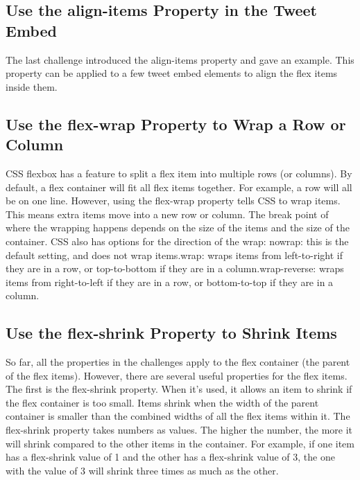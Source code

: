 \documentclass{article}%
\begin{document}
%
\subsection{Use the align{-}items Property in the Tweet Embed}%
\label{subsec:Usethealign{-}itemsPropertyintheTweetEmbed}%
The last challenge introduced the align{-}items property and gave an example. This property can be applied to a few tweet embed elements to align the flex items inside them.\newline%

%
\subsection{Use the flex{-}wrap Property to Wrap a Row or Column}%
\label{subsec:Usetheflex{-}wrapPropertytoWrapaRoworColumn}%
CSS flexbox has a feature to split a flex item into multiple rows (or columns). By default, a flex container will fit all flex items together. For example, a row will all be on one line.\newline%
However, using the flex{-}wrap property tells CSS to wrap items. This means extra items move into a new row or column. The break point of where the wrapping happens depends on the size of the items and the size of the container.\newline%
CSS also has options for the direction of the wrap:\newline%
nowrap: this is the default setting, and does not wrap items.wrap: wraps items from left{-}to{-}right if they are in a row, or top{-}to{-}bottom if they are in a column.wrap{-}reverse: wraps items from right{-}to{-}left if they are in a row, or bottom{-}to{-}top if they are in a column.\newline%

%
\subsection{Use the flex{-}shrink Property to Shrink Items}%
\label{subsec:Usetheflex{-}shrinkPropertytoShrinkItems}%
So far, all the properties in the challenges apply to the flex container (the parent of the flex items). However, there are several useful properties for the flex items.\newline%
The first is the flex{-}shrink property. When it's used, it allows an item to shrink if the flex container is too small. Items shrink when the width of the parent container is smaller than the combined widths of all the flex items within it.\newline%
The flex{-}shrink property takes numbers as values. The higher the number, the more it will shrink compared to the other items in the container. For example, if one item has a flex{-}shrink value of 1 and the other has a flex{-}shrink value of 3, the one with the value of 3 will shrink three times as much as the other.\newline%
\end{document}
